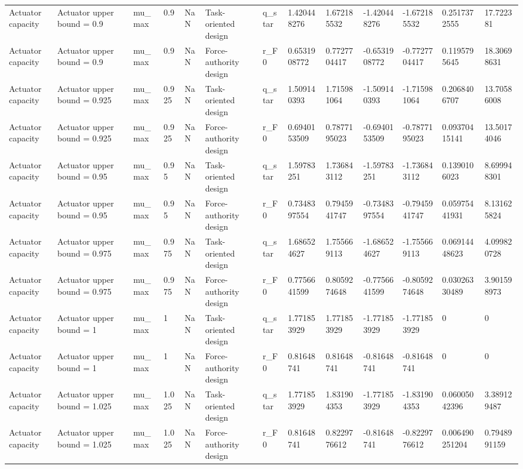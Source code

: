 \begin{tabular}{@{}lllllllllllll@{}}
Actuator capacity & Actuator upper bound = 0.9 & mu\_max & 0.9 & NaN & Task-oriented design & q\_star & 1.420448276 & 1.672185532 & -1.420448276 & -1.672185532 & 0.2517372555 & 17.722381 \\
Actuator capacity & Actuator upper bound = 0.9 & mu\_max & 0.9 & NaN & Force-authority design & r\_F0 & 0.6531908772 & 0.7727704417 & -0.6531908772 & -0.7727704417 & 0.1195795645 & 18.30698631 \\
Actuator capacity & Actuator upper bound = 0.925 & mu\_max & 0.925 & NaN & Task-oriented design & q\_star & 1.509140393 & 1.715981064 & -1.509140393 & -1.715981064 & 0.2068406707 & 13.70586008 \\
Actuator capacity & Actuator upper bound = 0.925 & mu\_max & 0.925 & NaN & Force-authority design & r\_F0 & 0.6940153509 & 0.7877195023 & -0.6940153509 & -0.7877195023 & 0.09370415141 & 13.50174046 \\
Actuator capacity & Actuator upper bound = 0.95 & mu\_max & 0.95 & NaN & Task-oriented design & q\_star & 1.59783251 & 1.736843112 & -1.59783251 & -1.736843112 & 0.1390106023 & 8.699948301 \\
Actuator capacity & Actuator upper bound = 0.95 & mu\_max & 0.95 & NaN & Force-authority design & r\_F0 & 0.7348397554 & 0.7945941747 & -0.7348397554 & -0.7945941747 & 0.05975441931 & 8.131625824 \\
Actuator capacity & Actuator upper bound = 0.975 & mu\_max & 0.975 & NaN & Task-oriented design & q\_star & 1.686524627 & 1.755669113 & -1.686524627 & -1.755669113 & 0.06914448623 & 4.099820728 \\
Actuator capacity & Actuator upper bound = 0.975 & mu\_max & 0.975 & NaN & Force-authority design & r\_F0 & 0.7756641599 & 0.8059274648 & -0.7756641599 & -0.8059274648 & 0.03026330489 & 3.901598973 \\
Actuator capacity & Actuator upper bound = 1 & mu\_max & 1 & NaN & Task-oriented design & q\_star & 1.771853929 & 1.771853929 & -1.771853929 & -1.771853929 & 0 & 0 \\
Actuator capacity & Actuator upper bound = 1 & mu\_max & 1 & NaN & Force-authority design & r\_F0 & 0.81648741 & 0.81648741 & -0.81648741 & -0.81648741 & 0 & 0 \\
Actuator capacity & Actuator upper bound = 1.025 & mu\_max & 1.025 & NaN & Task-oriented design & q\_star & 1.771853929 & 1.831904353 & -1.771853929 & -1.831904353 & 0.06005042396 & 3.389129487 \\
Actuator capacity & Actuator upper bound = 1.025 & mu\_max & 1.025 & NaN & Force-authority design & r\_F0 & 0.81648741 & 0.8229776612 & -0.81648741 & -0.8229776612 & 0.006490251204 & 0.7948991159 \\

\end{tabular}
